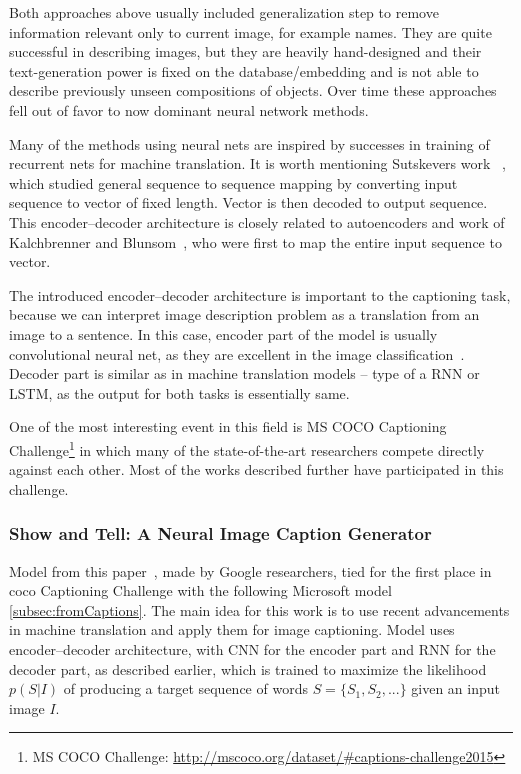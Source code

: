 Both approaches above usually included generalization step to remove information relevant only to current image, for example names. They are quite successful in describing images, but they are heavily hand-designed and their text-generation power is fixed on the database/embedding and is not able to describe previously unseen compositions of objects. Over time these approaches fell out of favor to now dominant neural network methods.

Many of the methods using neural nets are inspired by successes in training of recurrent nets for machine translation. It is worth mentioning Sutskevers work ~\cite{DBLP:journals/corr/SutskeverVL14}, which studied general sequence to sequence mapping by converting input sequence to vector of fixed length. Vector is then decoded to output sequence. This encoder--decoder architecture is closely related to autoencoders and work of Kalchbrenner and Blunsom~\cite{conf/emnlp/KalchbrennerB13}, who were first to map the entire input sequence to vector.

The introduced encoder--decoder architecture is important to the captioning task, because we can interpret image description problem as a translation from an image to a sentence. In this case, encoder part of the model is usually convolutional neural net, as they are excellent in the image classification~\cite{DBLP:journals/corr/SzegedyLJSRAEVR14}. Decoder part is similar as in machine translation models -- type of a RNN or LSTM, as the output for both tasks is essentially same.

One of the most interesting event in this field is MS COCO Captioning Challenge\footnote{MS COCO Challenge: \url{http://mscoco.org/dataset/\#captions-challenge2015}} in which many of the state-of-the-art researchers compete directly against each other. Most of the works described further have participated in this challenge.


		\subsubsection{Show and Tell: A Neural Image Caption Generator} \label{subsubsec:showtell}

Model from this paper~\cite{DBLP:journals/corr/VinyalsTBE14}, made by Google researchers, tied for the first place in \gls{coco} Captioning Challenge with the following Microsoft model \ref{subsec:fromCaptions}. The main idea for this work is to use recent advancements in machine translation and apply them for image captioning. Model uses encoder--decoder architecture, with CNN for the encoder part and RNN for the decoder part, as described earlier, which is trained to maximize the likelihood $ p(S|I) $ of producing a target sequence of words $ S = \{S_1,S_2,...\} $ given an input image $ I $.

